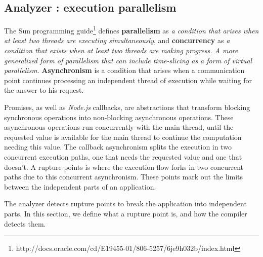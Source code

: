 
\subsection{Analyzer : execution parallelism} \label{section:analyzer}

The Sun programming guide\footnote{\raggedright http://docs.oracle.com/cd/E19455-01/806-5257/6je9h032b/index.html} defines \textbf{parallelism} as \textit{a condition that arises when at least two threads are executing simultaneously}, and \textbf{concurrency} as \textit{a condition that exists when at least two threads are making progress. A more generalized form of parallelism that can include time-slicing as a form of virtual parallelism}.
\textbf{Asynchronism} is a condition that arises when a communication point continues processing an independent thread of execution while waiting for the answer to his request.

Promises\cite{Liskov1988}, as well as \textit{Node.js} callbacks, are abstractions that transform blocking synchronous operations into non-blocking asynchronous operations.
These asynchronous operations run concurrently with the main thread, until the requested value is available for the main thread to continue the computation needing this value.
The callback asynchronism splits the execution in two concurrent execution paths, one that needs the requested value and one that doesn't.
A rupture points is where the execution flow forks in two concurrent paths due to this concurrent asynchronism.
These points mark out the limits between the independent parts of an application.
 
The analyzer detects rupture points to break the application into independent parts.
In this section, we define what a rupture point is, and how the compiler detects them.

